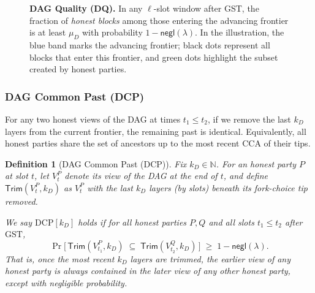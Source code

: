 \documentclass[11pt]{article}
\newtheorem{definition}[theorem]{Definition}
\newcommand{\negl}{\ensuremath{\mathsf{negl}}\xspace}
\begin{document}
\begin{figure}[htp!]
\centering
{}
\caption{\textbf{DAG Quality (DQ).} 
\small 
In any $\ell$-slot window after GST, the fraction of \emph{honest blocks} among those entering the advancing frontier is at least $\mu_D$ with probability $1-\negl(\lambda)$. 
In the illustration, the blue band marks the advancing frontier; 
black dots represent all blocks that enter this frontier, 
and green dots highlight the subset created by honest parties.}
\label{fig:dq}
\end{figure}





\subsubsection{DAG Common Past (DCP)}
\label{sec:DCP}

For any two honest views of the DAG at times $t_1\le t_2$, if we remove the last $k_D$ layers from the current frontier, the remaining past is identical. Equivalently, all honest parties share the set of ancestors up to the most recent CCA of their tips.

\begin{definition}[DAG Common Past (DCP)]\label{def:DCP}
Fix $k_D \in \mathbb{N}$. For an honest party $P$ at slot $t$, let $V_t^P$ denote
its view of the DAG at the end of $t$, and define
$\mathsf{Trim}(V_t^P,k_D)$ as $V_t^P$ with the last $k_D$ layers (by slots)
beneath its fork-choice tip removed.

We say $\mathrm{DCP}[k_D]$ holds if for all honest parties $P,Q$ and all slots
$t_1 \le t_2$ after $\mathrm{GST}$,
\[
\Pr\!\Big[\, \mathsf{Trim}(V_{t_1}^P,k_D)\;\subseteq\;\mathsf{Trim}(V_{t_2}^Q,k_D)\,\Big]
\;\ge\; 1-\negl(\lambda).
\]
That is, once the most recent $k_D$ layers are trimmed, the earlier view of
any honest party is always contained in the later view of any other honest party,
except with negligible probability.
\end{definition}
\end{document}
